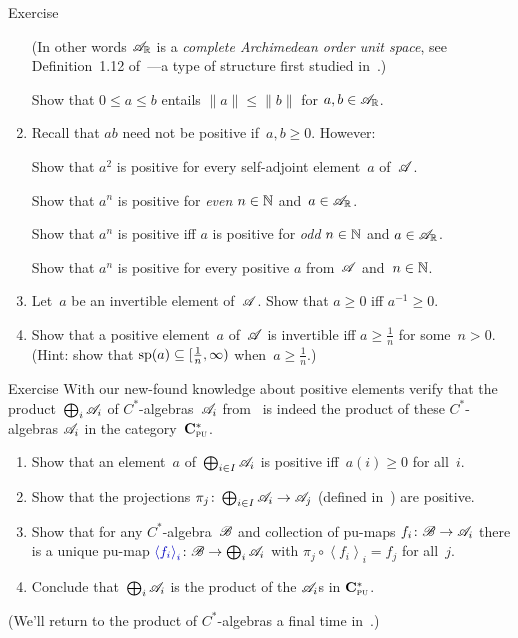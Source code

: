 \documentclass[a]{subfiles}
\begin{document}
\begin{parsec}
\begin{point}{Exercise}
\begin{enumerate}
(In other words
$\mathscr{A}_{\mathbb{R}}$ is a \emph{complete Archimedean order unit space},
see Definition~1.12 of~\cite{alfsen2012}---a 
type of structure first studied in~\cite{kadison1951}.)


Show that $0\leq a \leq b$ entails $\|a\|\leq \|b\|$
for $a,b\in\mathscr{A}_{\mathbb{R}}$.

\item 
Recall that $ab$ need not be positive if~$a,b\geq 0$. However:

Show that $a^2$ is positive for every self-adjoint element~$a$ of~$\mathscr{A}$.

Show that $a^n$ is positive for \emph{even} $n\in \mathbb{N}$ and~$a\in\mathscr{A}_{\mathbb{R}}$.

Show that $a^n$ is positive iff $a$ is positive for \emph{odd} $n\in \mathbb{N}$
and $a\in\mathscr{A}_{\mathbb{R}}$.

Show that $a^n$ is positive
for every positive $a$ from~$\mathscr{A}$ and~$n\in \mathbb{N}$.
\item
Let~$a$ be an invertible element of~$\mathscr{A}$.
Show that $a\geq 0$ iff $a^{-1}\geq 0$.

\item
Show that a positive element~$a$ of~$\mathscr{A}$ is invertible
iff $a\geq \frac{1}{n}$ for some~$n>0$.
(Hint: show that $\mathrm{sp}(a)\subseteq [\frac{1}{n},\infty)$
		when~$a\geq \frac{1}{n}$.)
\end{enumerate}
\end{point}
\end{parsec}
\begin{parsec}%
\begin{point}{Exercise}%
%
With our new-found
knowledge about positive elements
verify that
the product~$\bigoplus_i \mathscr{A}_i$
of $C^*$-algebras~$\mathscr{A}_i$
from~
is indeed the product of these $C^*$-algebras $\mathscr{A}_i$
in the category~$\mathbf{C}^*_{\text{\textsc{pu}}}$.
\begin{enumerate}
\item
Show
that an element~$a$ of~$\bigoplus_{i\in I} \mathscr{A}_i$
is positive iff~$a(i)\geq 0$ for all~$i$.
\item
Show that the projections $\pi_j\colon \bigoplus_{i \in I}
\mathscr{A}_i \to\mathscr{A}_j$
(defined in~)
are positive.
\item
Show that for any $C^*$-algebra~$\mathscr{B}$
and collection
of pu-maps $f_i\colon \mathscr{B}\to\mathscr{A}_i$
there is a unique pu-map
$\Define{\left<f_i\right>_i}\colon
\scrB\to\bigoplus_{i}\scrA_i$
with $\pi_j\circ \left<f_i\right>_i = f_j$
for all~$j$.
\item
Conclude that~$\bigoplus_i \mathscr{A}_i$
is
the product of the $\mathscr{A}_i$s
in $\mathbf{C}^*_{\text{\textsc{pu}}}$.
\end{enumerate}
(We'll return to the product of $C^*$-algebras
a final time in~.)
\end{point}
\end{parsec}
\end{document}

